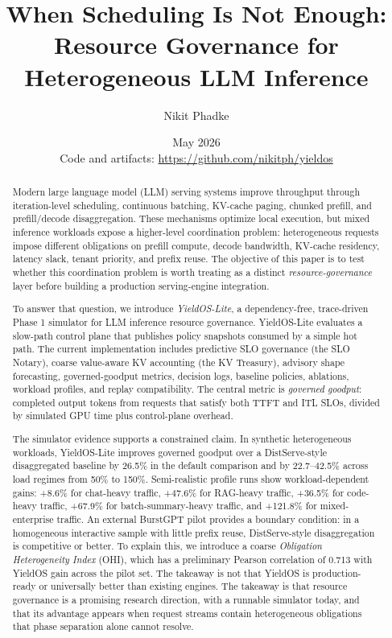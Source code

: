 \documentclass[11pt]{article}
\title{When Scheduling Is Not Enough:\\Resource Governance for Heterogeneous LLM Inference}
\author{Nikit Phadke}
\date{May 2026\\[0.6em]%
  {\normalsize Code and artifacts: \url{https://github.com/nikitph/yieldos}}}
\begin{document}
\maketitle

\begin{abstract}
Modern large language model (LLM) serving systems improve throughput through iteration-level scheduling, continuous batching, KV-cache paging, chunked prefill, and prefill/decode disaggregation. These mechanisms optimize local execution, but mixed inference workloads expose a higher-level coordination problem: heterogeneous requests impose different obligations on prefill compute, decode bandwidth, KV-cache residency, latency slack, tenant priority, and prefix reuse. The objective of this paper is to test whether this coordination problem is worth treating as a distinct \emph{resource-governance} layer before building a production serving-engine integration.

To answer that question, we introduce \emph{YieldOS-Lite}, a dependency-free, trace-driven Phase 1 simulator for LLM inference resource governance. YieldOS-Lite evaluates a slow-path control plane that publishes policy snapshots consumed by a simple hot path. The current implementation includes predictive SLO governance (the SLO Notary), coarse value-aware KV accounting (the KV Treasury), advisory shape forecasting, governed-goodput metrics, decision logs, baseline policies, ablations, workload profiles, and replay compatibility. The central metric is \emph{governed goodput}: completed output tokens from requests that satisfy both TTFT and ITL SLOs, divided by simulated GPU time plus control-plane overhead.

The simulator evidence supports a constrained claim. In synthetic heterogeneous workloads, YieldOS-Lite improves governed goodput over a DistServe-style disaggregated baseline by 26.5\% in the default comparison and by 22.7--42.5\% across load regimes from 50\% to 150\%. Semi-realistic profile runs show workload-dependent gains: +8.6\% for chat-heavy traffic, +47.6\% for RAG-heavy traffic, +36.5\% for code-heavy traffic, +67.9\% for batch-summary-heavy traffic, and +121.8\% for mixed-enterprise traffic. An external BurstGPT pilot provides a boundary condition: in a homogeneous interactive sample with little prefix reuse, DistServe-style disaggregation is competitive or better. To explain this, we introduce a coarse \emph{Obligation Heterogeneity Index} (OHI), which has a preliminary Pearson correlation of 0.713 with YieldOS gain across the pilot set. The takeaway is not that YieldOS is production-ready or universally better than existing engines. The takeaway is that resource governance is a promising research direction, with a runnable simulator today, and that its advantage appears when request streams contain heterogeneous obligations that phase separation alone cannot resolve.
\end{abstract}
\end{document}
